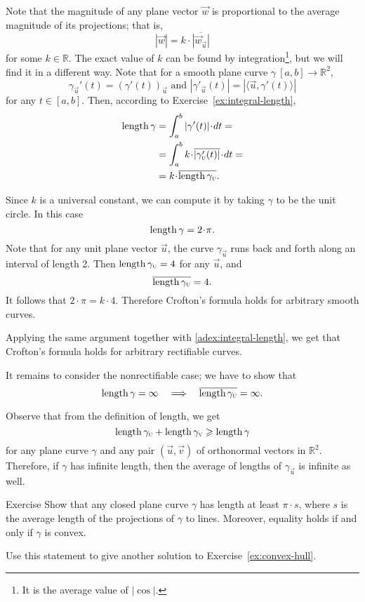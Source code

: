 Note that the magnitude of any plane vector ${\vec w}$ is proportional to the average magnitude of its projections; that is,
\[|{\vec w}|=k\cdot \overline{|{\vec w}_{\vec u}|}\]
for some $k \in \mathbb{R}$.
The exact value of $k$ can be found by integration\footnote{It is the average value of $|\cos|$.}, but we will find it in a different way. 
Note that for a smooth plane curve $\gamma\:[a,b]\to\mathbb{R}^2$,
\[\gamma_{\vec u}'(t) = (\gamma'(t))_{\vec u} \text{ and }     | \gamma'_{\vec u} (t) |  =  | \langle \vec u , \gamma' (t) \rangle |     \]
for any $t \in [a,b]$. Then, according to Exercise~\ref{ex:integral-length},
\begin{align*}
\length\gamma
&=\int_a^b|\gamma'(t)|\cdot dt=
\\
&=\int_a^b  k\cdot \overline{|\gamma_{\vec u}'(t)|}\cdot dt=
\\
&=k\cdot \overline{\length\gamma_{\vec u}}.
\end{align*}

Since $k$ is a universal constant, we can compute it by taking $\gamma$ to be the unit circle.
In this case
\[\length \gamma=2\cdot\pi.\]
Note that for any unit plane vector ${\vec u}$, the curve $\gamma_{\vec u}$ runs back and forth along an interval of length 2.
Then $\mathop{\rm length}\nolimits\gamma_{\text{\sc{u}}}=4$ for any $\vec u$, and
\[\overline{\mathop{\rm length}\nolimits\gamma_{\text{\sc{u}}}} =4.\]
It follows that $2\cdot \pi =k\cdot 4$.
Therefore Crofton's formula holds for arbitrary smooth curves.

Applying the same argument together with \ref{adex:integral-length}, we get that Crofton's formula holds for arbitrary rectifiable curves.

It remains to consider the nonrectifiable case;
we have to show that 
\[\mathop{\rm length}\nolimits\gamma=\infty
\quad\Longrightarrow\quad
\overline{\mathop{\rm length}\nolimits\gamma_{\text{\sc{u}}}}=\infty.
\]

Observe that from the definition of length, we get
\[\mathop{\rm length}\nolimits\gamma_{\text{\sc{u}}}+\mathop{\rm length}\nolimits\gamma_{\text{\sc{v}}}\geqslant \mathop{\rm length}\nolimits\gamma\]
for any plane curve $\gamma$ and any pair $(\vec u , \vec v )$ of orthonormal vectors in $\mathbb{R}^2$.
Therefore, if $\gamma$ has infinite length, then the average of lengths of $\gamma_{\vec u}$ is infinite as well.
\qeds

\begin{thm}{Exercise}\label{ex:convex-croftons}
Show that any closed plane curve $\gamma$ has length at least $\pi\cdot s$, where $s$ is the average length of the projections of $\gamma$ to lines.
Moreover, equality holds if and only if $\gamma$ is convex.

Use this statement to give another solution to Exercise~\ref{ex:convex-hull}.
\end{thm}

